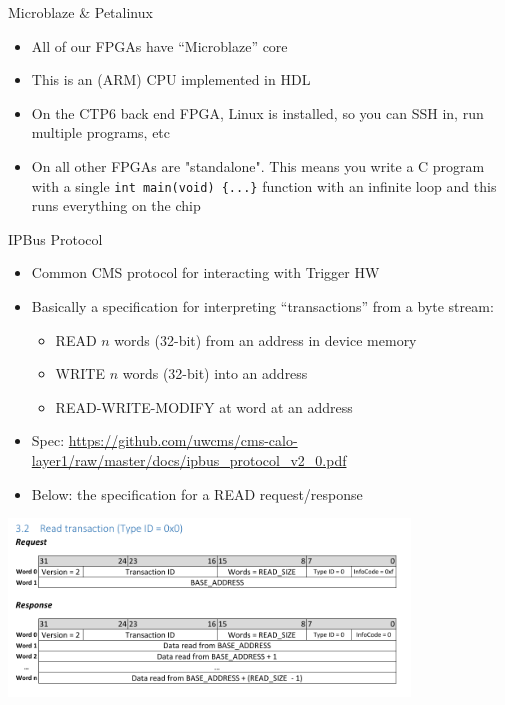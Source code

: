 \documentclass{beamer}
\begin{document}
\begin{frame}{Microblaze \& Petalinux}
\begin{itemize}
\item All of our FPGAs have ``Microblaze'' core
\item This is an (ARM) CPU implemented in HDL
\item On the CTP6 back end FPGA, Linux is installed, so you can SSH in, run multiple programs, etc
\item On all other FPGAs are "standalone". This means you write a C program with a single {\tt int main(void) \{...\}} function
with an infinite loop and this runs everything on the chip
\end{itemize}
\end{frame}

\begin{frame}{IPBus Protocol}
\begin{itemize}
\item Common CMS protocol for interacting with Trigger HW
\item Basically a specification for interpreting ``transactions'' from a byte stream:
\begin{itemize}
\item READ $n$ words (32-bit) from an address in device memory 
\item WRITE $n$ words (32-bit) into an address
\item READ-WRITE-MODIFY at word at an address
\end{itemize}
\item Spec: \url{https://github.com/uwcms/cms-calo-layer1/raw/master/docs/ipbus_protocol_v2_0.pdf}
\item Below: the specification for a READ request/response
\end{itemize}
\begin{center}
\includegraphics[width=0.8\textwidth]{images/ipbus_read.pdf}
\end{center}
\end{frame}
\end{document}
